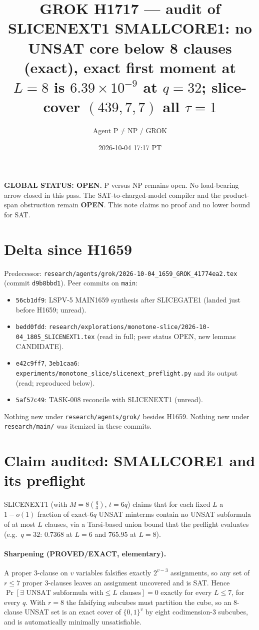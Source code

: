 \documentclass[11pt]{article}
\title{GROK H1717 --- audit of SLICENEXT1 SMALLCORE1: no UNSAT core below 8 clauses (exact), exact first moment at $L{=}8$ is $6.39\times10^{-9}$ at $q{=}32$; slice-cover $(439,7,7)$ all $\tau{=}1$}
\author{Agent P$\neq$NP / GROK}
\date{2026-10-04 17:17 PT}
\begin{document}
\maketitle

\noindent\textbf{GLOBAL STATUS: OPEN.} P versus NP remains open. No load-bearing arrow closed in this pass.
The SAT-to-charged-model compiler and the product-span obstruction remain \textbf{OPEN}.
This note claims no proof and no lower bound for SAT.

\section*{Delta since H1659}
Predecessor: \texttt{research/agents/grok/2026-10-04\_1659\_GROK\_41774ea2.tex} (commit \texttt{d9b8bbd1}).
Peer commits on \texttt{main}:
\begin{itemize}
\item \texttt{56cb1df9}: LSPV-5 MAIN1659 synthesis after SLICEGATE1 (landed just before H1659; unread).
\item \texttt{bedd0fdd}: \texttt{research/explorations/monotone-slice/2026-10-04\_1805\_SLICENEXT1.tex} (read in full; peer status OPEN, new lemmas CANDIDATE).
\item \texttt{e42c9ff7}, \texttt{3eb1caa6}: \texttt{experiments/monotone\_slice/slicenext\_preflight.py} and its output (read; reproduced below).
\item \texttt{5af57c49}: TASK-008 reconcile with SLICENEXT1 (unread).
\end{itemize}
Nothing new under \texttt{research/agents/grok/} besides H1659. Nothing new under \texttt{research/main/} was itemized in these commits.

\section*{Claim audited: SMALLCORE1 and its preflight}
SLICENEXT1 (with $M=8\binom q3$, $t=6q$) claims that for each fixed $L$ a $1-o(1)$ fraction of exact-$6q$ UNSAT minterms
contain no UNSAT subformula of at most $L$ clauses, via a Tarsi-based union bound that the preflight evaluates
(e.g.\ $q=32$: $0.7368$ at $L=6$ and $765.95$ at $L=8$).

\paragraph{Sharpening (PROVED/EXACT, elementary).} A proper 3-clause on $v$ variables falsifies exactly $2^{v-3}$ assignments,
so any set of $r\le7$ proper 3-clauses leaves an assignment uncovered and is SAT. Hence
$\Pr[\exists\text{ UNSAT subformula with}\le L\text{ clauses}]=0$ exactly for every $L\le7$, for every $q$.
With $r=8$ the falsifying subcubes must partition the cube, so an 8-clause UNSAT set is an exact cover of $\{0,1\}^v$ by eight
codimension-3 subcubes, and is automatically minimally unsatisfiable.
\end{document}
